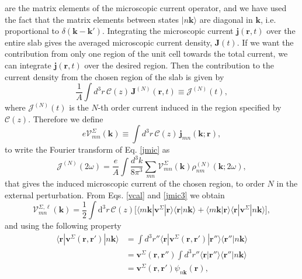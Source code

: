are the matrix elements of the microscopic current operator, and we have used
the fact that the matrix elements between states $|n\mathbf{k}\rangle$ are
diagonal in $\mathbf{k}$, i.e. proportional to $\delta(\mathbf{k}-\mathbf{k}')$.
Integrating the microscopic current $\mathbf{j}(\mathbf{r},t)$ over the entire
slab gives the averaged microscopic current density, $\mathbf{J}(t)$. If we want
the contribution from only one region of the unit cell towards the total
current, we can integrate $\mathbf{j}({\mathbf r},t)$ over the desired region.
Then the contribution to the current density from the chosen region of the slab
is given by
\begin{equation*}
\frac{1}{A}\int d^3r\, \boldsymbol{\mathcal{C}}(z)\, 
\mathbf{J}^{(N)} (\mathbf{r},t)
 \equiv \boldsymbol{\mathcal{J}}^{(N)}(t),
\end{equation*}
where $\boldsymbol{\mathcal{J}}^{(N)}(t)$ is the $N$-th order current
induced in the region specified by $\boldsymbol{\mathcal{C}}(z)$. Therefore we
define
\begin{equation}
e{\boldsymbol{\mathcal{V}}}^{\Sigma}_{mn}(\mathbf{k})
\equiv
\int d^3r\,
\boldsymbol{\mathcal{C}}(z)\,\mathbf{j}_{mn}({\mathbf{k}};\mathbf{r}),
\label{vcal}
\end{equation}
to write the Fourier transform of Eq. \eqref{jmic} as
\begin{equation}
\boldsymbol{\mathcal{J}}^{(N)}(2\omega)=\frac{e}{A}
\int \frac{d^3 k}{8\pi^3}
\sum_{mn}
\boldsymbol{\mathcal{V}}^{\Sigma}_{mn}(\mathbf{k}) 
\rho^{(N)}_{nm}(\mathbf{k};2\omega), 
\label{jmac2}
\end{equation}
that gives the induced microscopic current of the chosen region, to order $N$ in
the external perturbation. From Eqs. \eqref{vcal} and \eqref{jmic3} we obtain
\begin{equation}\label{intj}
{\boldsymbol{\mathcal{V}}}^{\Sigma,\ell}_{mn}({\mathbf k})=
\frac{1}{2}
\int \mathrm{d}^3 r\,
 \mathcal{C}(z)
\bigg[
\langle m\mathbf{k}|\mathbf{v}^\Sigma | \mathbf{r}\rangle
\langle \mathbf{r} | n \mathbf k \rangle +
\langle m\mathbf{k} | \mathbf{r}\rangle
\langle \mathbf{r} | \mathbf{v}^\Sigma | n \mathbf k \rangle\bigg],
\end{equation}  
and using the following property
\begin{align}\label{nl.2}
\langle\mathbf{r}|\mathbf{v}^{\Sigma}(\mathbf{r},\mathbf{r}')|n\mathbf{k}\rangle
&= \int d^3 r'' 
\langle\mathbf{r}|
\mathbf{v}^{\Sigma}(\mathbf{r},\mathbf{r}')
|\mathbf{r}''\rangle
\langle\mathbf{r}''|n\mathbf{k}\rangle\nonumber\\
&= \mathbf{v}^{\Sigma}(\mathbf{r},\mathbf{r}'')
\int d^3 r'' \langle\mathbf{r}|\mathbf{r}''\rangle
\langle\mathbf{r}''|n\mathbf{k}\rangle\nonumber\\
&= \mathbf{v}^{\Sigma}(\mathbf{r},\mathbf{r}')
\psi_{n\mathbf{k}}(\mathbf{r}),
\end{align}
